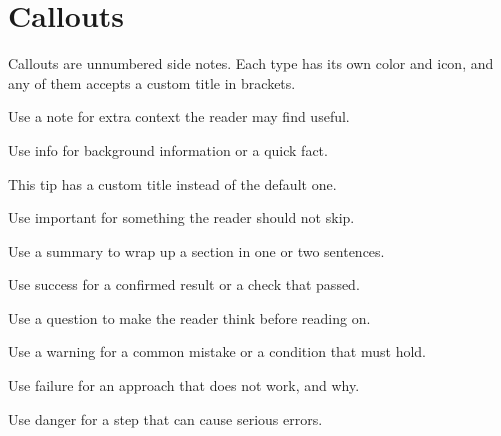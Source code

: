 \section{Callouts}\label{sec:callouts}

Callouts are unnumbered side notes. Each type has its own color and icon, and
any of them accepts a custom title in brackets.

\begin{note}
Use a note for extra context the reader may find useful.
\end{note}

\begin{info}
Use info for background information or a quick fact.
\end{info}

\begin{tip}
This tip has a custom title instead of the default one.
\end{tip}

\begin{important}
Use important for something the reader should not skip.
\end{important}

\begin{summary}
Use a summary to wrap up a section in one or two sentences.
\end{summary}

\begin{success}
Use success for a confirmed result or a check that passed.
\end{success}

\begin{question}
Use a question to make the reader think before reading on.
\end{question}

\begin{warning}
Use a warning for a common mistake or a condition that must hold.
\end{warning}

\begin{failure}
Use failure for an approach that does not work, and why.
\end{failure}

\begin{danger}
Use danger for a step that can cause serious errors.
\end{danger}

